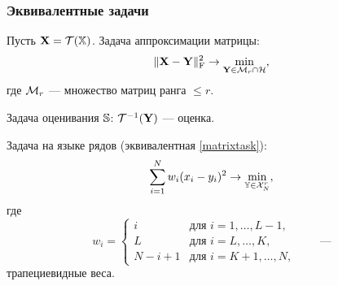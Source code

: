 \documentclass[unicode, notheorems]{beamer}
\begin{document}
\begin{frame}
	\frametitle{Эквивалентные задачи}
	\vspace{-0.2cm}
	Пусть $\mathbf{X} = \mathcal{T}(\mathbb{X})$. Задача аппроксимации матрицы:
	\begin{equation} \label{matrixtask}
	\|\mathbf{X} - \mathbf{Y}\|^2_{\mathrm{F}} \to \min_{\substack{\mathbf{Y} \in \mathcal{M}_r \cap \mathcal{H}}},
	\end{equation}
	где $\mathcal{M}_r$ --- множество матриц ранга $\le r$.
	
	Задача оценивания $\mathbb{S}$: $\mathcal{T}^{-1}(\mathbf{Y})$ --- оценка.
	
	Задача на языке рядов (эквивалентная \eqref{matrixtask}):
	\begin{equation*}
	\sum \limits_{i=1}^N w_i(x_i - y_i)^2 \to \min_{\mathbb{Y} \in \mathcal{X}_N^r},
	\end{equation*}
	где	\begin{equation*}
	w_i = \begin{cases}
	i & \text{для $i = 1, \ldots, L-1,$}\\
	L & \text{для $i = L, \ldots, K,$}\\
	N - i + 1 & \text{для $i = K + 1, \ldots, N,$}
	\end{cases} \qquad \text{---}
	\end{equation*}
	трапециевидные веса.
\end{frame}

\end{document}
